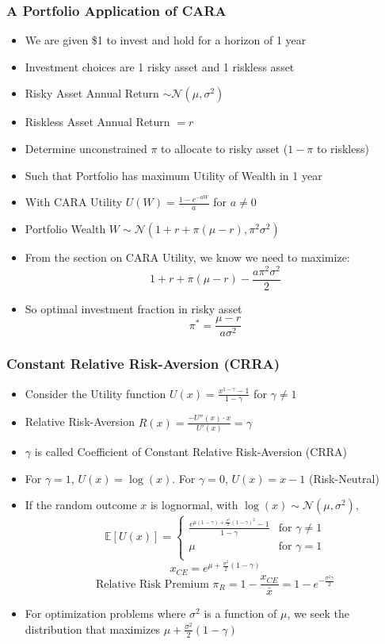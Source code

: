 \documentclass[handout]{beamer}
\begin{document}
\begin{frame}
\frametitle{A Portfolio Application of CARA}
\pause
\begin{itemize}[<+->]
\item We are given \$1 to invest and hold for a horizon of 1 year
\item Investment choices are 1 risky asset and 1 riskless asset
\item Risky Asset Annual Return $\sim \mathcal{N}(\mu, \sigma^2)$
\item Riskless Asset Annual Return $=r$
\item Determine unconstrained $\pi$ to allocate to risky asset ($1-\pi$ to riskless)
\item Such that Portfolio has maximum Utility of Wealth in 1 year
\item With CARA Utility $U(W) = \frac {1 -e^{-aW}} {a}$ for $a \neq 0$
\item Portfolio Wealth $W \sim \mathcal{N}(1+ r + \pi(\mu - r), \pi^2 \sigma^2)$
\item From the section on CARA Utility, we know we need to maximize:
$$1+r+\pi (\mu - r) - \frac {a \pi^2 \sigma^2} 2$$
\item So optimal investment fraction in risky asset
$$\pi^* = \frac {\mu - r} {a \sigma^2}$$
\end{itemize}
\end{frame}

\begin{frame}
\frametitle{Constant Relative Risk-Aversion (CRRA)}
\pause
\begin{itemize}[<+->]
\item Consider the Utility function $U(x) = \frac {x^{1 - \gamma} - 1} {1 - \gamma}$ for $\gamma \neq 1$
\item Relative Risk-Aversion $R(x) = \frac {-U''(x) \cdot x} {U'(x)} = \gamma$
\item $\gamma$ is called Coefficient of Constant Relative Risk-Aversion (CRRA)
\item For $\gamma = 1$, $U(x) = \log(x)$. For $\gamma = 0$, $U(x) = x - 1$ (Risk-Neutral)
\item If the random outcome $x$ is lognormal, with $\log(x) \sim \mathcal{N}(\mu, \sigma^2)$,
$$
\mathbb{E}[U(x)] = 
\begin{cases}
\frac {e^{\mu (1 - \gamma) + \frac {\sigma^2} 2 (1-\gamma)^2} - 1} {1 - \gamma} & \text{for } \gamma \neq 1\\
\mu & \text {for } \gamma = 1\\
\end{cases}
$$
$$x_{CE} = e^{\mu + \frac {\sigma^2} 2 (1- \gamma)}$$
$$\mbox{Relative Risk Premium } \pi_R = 1 - \frac {x_{CE}} {\bar{x}} =  1 - e^{-\frac {\sigma^2 \gamma} 2}$$
\item For optimization problems where $\sigma^2$ is a function of $\mu$, we seek the distribution that maximizes $\mu + \frac {\sigma^2} 2 (1 - \gamma)$
\end{itemize}
\end{frame}
\end{document}
